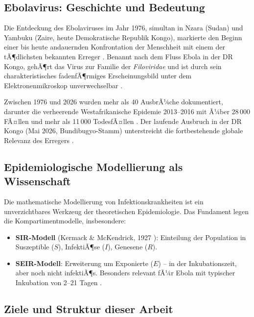 ﻿\documentclass[12pt,a4paper]{article}
\theoremstyle{definition}
\theoremstyle{plain}
\theoremstyle{remark}
\begin{document}
\subsection{Ebolavirus: Geschichte und Bedeutung}

Die Entdeckung des Ebolaviruses im Jahr 1976, simultan in Nzara (Sudan) und
Yambuku (Zaire, heute Demokratische Republik Kongo), markierte den Beginn einer
bis heute andauernden Konfrontation der Menschheit mit einem der tÃ¶dlichsten
bekannten Erreger \cite{johnson1977,bowen1977}. Benannt nach dem Fluss Ebola
in der DR Kongo, gehÃ¶rt das Virus zur Familie der \textit{Filoviridae} und ist
durch sein charakteristisches fadenfÃ¶rmiges Erscheinungsbild unter dem
Elektronenmikroskop unverwechselbar \cite{murphy1978}.

Zwischen 1976 und 2026 wurden mehr als 40 AusbrÃ¼che dokumentiert, darunter
die verheerende Westafrikanische Epidemie 2013--2016 mit Ã¼ber 28\,000 FÃ¤llen
und mehr als 11\,000 TodesfÃ¤llen \cite{who2016report}. Der laufende Ausbruch
in der DR Kongo (Mai 2026, Bundibugyo-Stamm) unterstreicht die fortbestehende
globale Relevanz des Erregers \cite{who2026drc}.

\subsection{Epidemiologische Modellierung als Wissenschaft}

Die mathematische Modellierung von Infektionskrankheiten ist ein unverzichtbares
Werkzeug der theoretischen Epidemiologie. Das Fundament legen die Kompartimentmodelle,
insbesondere:
\begin{itemize}
  \item \textbf{SIR-Modell} (Kermack \& McKendrick, 1927 \cite{kermack1927}):
    Einteilung der Population in Suszeptible ($S$), InfektiÃ¶se ($I$), Genesene ($R$).
  \item \textbf{SEIR-Modell}: Erweiterung um Exponierte ($E$) -- in der Inkubationszeit,
    aber noch nicht infektiÃ¶s. Besonders relevant fÃ¼r Ebola mit typischer
    Inkubation von 2--21 Tagen \cite{WHO2014incubation}.
\end{itemize}

\subsection{Ziele und Struktur dieser Arbeit}
\end{document}
